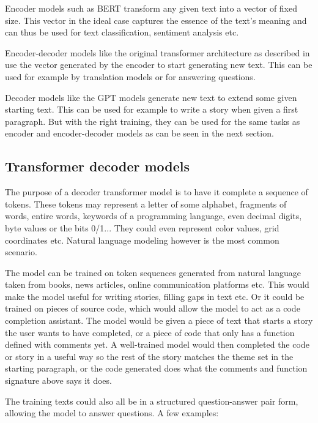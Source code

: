 Encoder models such as BERT \cite{devlin2019bert} transform any given text into a vector of fixed size. This vector in the ideal case captures the essence of the text's meaning and can thus be used for text classification, sentiment analysis etc.

Encoder-decoder models like the original transformer architecture as described in \cite{allyouneed} use the vector generated by the encoder to start generating new text. This can be used for example by translation models or for answering questions.

Decoder models like the GPT models \cite{improvinglu} generate new text to extend some given starting text. This can be used for example to write a story when given a first paragraph. But with the right training, they can be used for the same tasks as encoder and encoder-decoder models as can be seen in the next section.

\subsection{Transformer decoder models}

The purpose of a decoder transformer model is to have it complete a sequence of tokens. These tokens may represent a letter of some alphabet, fragments of words, entire words, keywords of a programming language, even decimal digits, byte values or the bits 0/1...
They could even represent color values, grid coordinates etc. Natural language modeling however is the most common scenario.

The model can be trained on token sequences generated from natural language taken from books, news articles, online communication platforms etc. This would make the model useful for writing stories, filling gaps in text etc.
Or it could be trained on pieces of source code, which would allow the model to act as a code completion assistant.
The model would be given a piece of text that starts a story the user wants to have completed, or a piece of code that only has a function defined with comments yet. A well-trained model would then completed the code or story in a useful way so the rest of the story matches the theme set in the starting paragraph, or the code generated does what the comments and function signature above says it does.

The training texts could also all be in a structured question-answer pair form, allowing the model to answer questions. A few examples:
\label{transformer:examples}

